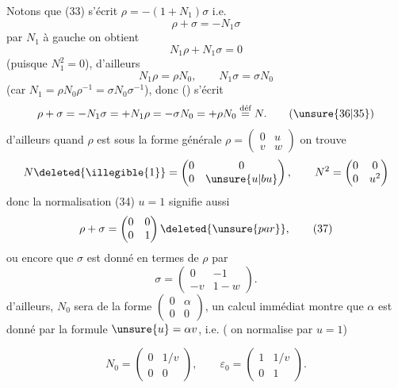 
Notons que (33) s'écrit $\rho=-(1+N_1)\sigma$ i.e.
\[
\rho+\sigma=-N_1\sigma \tag{35}
\]
 par $N_1$ à gauche on obtient
\[
N_1\rho+N_1\sigma=0
\]
(puisque $N_1^2=0$), d'ailleurs
\[
N_1\rho=\rho N_0,\qquad N_1\sigma=\sigma N_0
\]
(car $N_1=\rho N_0\rho^{-1}=\sigma N_0\sigma^{-1}$), donc () s'écrit
\[
\rho+\sigma=-N_1\sigma=+N_1\rho=-\sigma N_0=+\rho N_0
\overset{\text{déf}}{=}N . \tag{\unsure{36|35}}
\]
d'ailleurs quand $\rho$ est sous la forme générale
$\rho=\begin{pmatrix}0&u\\v&w\end{pmatrix}$ on trouve
\[
N\deleted{\illegible{1}}=\begin{pmatrix}0&0\\0&\unsure{u|bu}\end{pmatrix},
\qquad N^2=\begin{pmatrix}0&0\\0&u^2\end{pmatrix}
\]
donc la normalisation (34) $u=1$ signifie aussi
\[
\rho+\sigma=\begin{pmatrix}0&0\\0&1\end{pmatrix}\deleted{\unsure{par}}, \tag{37}
\]
ou encore que $\sigma$ est donné en termes de $\rho$ par
\[
\sigma=\begin{pmatrix}0&-1\\-v&1-w\end{pmatrix}. \tag{38}
\]
d'ailleurs, $N_0$  sera de la forme
$\begin{pmatrix}0&\alpha\\0&0\end{pmatrix}$,
un calcul immédiat montre que $\alpha$ est donné par la formule
$\unsure{u}=\alpha v$, i.e. ( on normalise par $u=1$)



\[
N_0=\begin{pmatrix}0&1/v\\0&0\end{pmatrix},\qquad
\varepsilon_0=\begin{pmatrix}1&1/v\\0&1\end{pmatrix}. \tag{39}
\]

